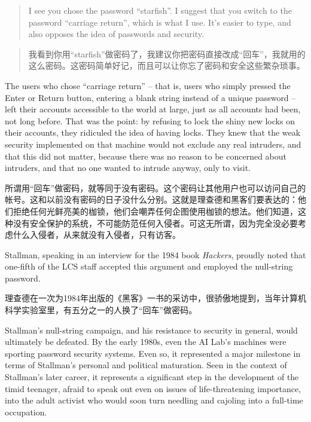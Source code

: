\ifdefined\eng
\begin{quote}
I see you chose the password ``starfish''. I suggest that you switch to the password ``carriage return'', which is what I use. It's easier to type, and also opposes the idea of passwords and security.
\end{quote}
\fi

\ifdefined\chs
\begin{quote}
我看到你用“starfish”做密码了，我建议你把密码直接改成“回车”，我就用的这么密码。这密码简单好记，而且可以让你忘了密码和安全这些繁杂琐事。
\end{quote}
\fi

\ifdefined\eng
The users who chose ``carriage return'' -- that is, users who simply pressed the Enter or Return button, entering a blank string instead of a unique password -- left their accounts accessible to the world at large, just as all accounts had been, not long before. That was the point: by refusing to lock the shiny new locks on their accounts, they ridiculed the idea of having locks. They knew that the weak security implemented on that machine would not exclude any real intruders, and that this did not matter, because there was no reason to be concerned about intruders, and that no one wanted to intrude anyway, only to visit.
\fi

\ifdefined\chs
所谓用“回车”做密码，就等同于没有密码。这个密码让其他用户也可以访问自己的帐号。这和以前没有密码的日子没什么分别。这就是理查德和黑客们要表达的：他们拒绝任何光鲜亮美的枷锁，他们会嘲弄任何企图使用枷锁的想法。他们知道，这种没有安全保护的系统，不可能防范任何入侵者。可这无所谓，因为完全没必要考虑什么入侵者，从来就没有入侵者，只有访客。
\fi

\ifdefined\eng
Stallman, speaking in an interview for the 1984 book \textit{Hackers}, proudly noted that one-fifth of the LCS staff accepted this argument and employed the null-string password.
\fi

\ifdefined\chs
理查德在一次为1984年出版的《黑客》一书的采访中，很骄傲地提到，当年计算机科学实验室里，有五分之一的人换了“回车”做密码。
\fi

\ifdefined\eng
Stallman's null-string campaign, and his resistance to security in general, would ultimately be defeated. By the early 1980s, even the AI Lab's machines were sporting password security systems. Even so, it represented a major milestone in terms of Stallman's personal and political maturation. Seen in the context of Stallman's later career, it represents a significant step in the development of the timid teenager, afraid to speak out even on issues of life-threatening importance, into the adult activist who would soon turn needling and cajoling into a full-time occupation.
\fi

